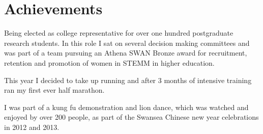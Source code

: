 \documentclass[11pt,a4paper,sans]{moderncv}
\begin{document}
%
%
%
%
\section{Achievements}
Being elected as college representative for over one hundred postgraduate research students. In this role I sat on several decision making committees and was part of a team pursuing an Athena SWAN Bronze award for recruitment, retention and promotion of women in STEMM in higher education. 

This year I decided to take up running and after 3 months of intensive training ran my first ever half marathon.

I was part of a kung fu demonstration and lion dance, which was watched and enjoyed by over 200 people,  as part of the Swansea Chinese new year celebrations in 2012 and 2013.
%

%
%
\end{document}
